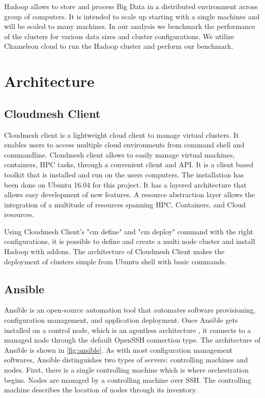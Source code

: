 \documentclass[9pt,twocolumn,twoside]{../../styles/osajnl}
\begin{document}
Hadoop allows to store and process Big Data in a distributed environment across group of computers. It is intended to scale up starting with a single machines and will be scaled to many machines. In our analysis we benchmark the performance of the clusters for various data sizes and cluster configurations. We utilize Chameleon cloud to run the Hadoop cluster and perform our benchmark.

\section{Architecture}
\subsection{Cloudmesh Client}
Cloudmesh client is a lightweight cloud client to manage virtual clusters. It enables users to access multiple cloud environments from command shell and commandline. Cloudmesh client allows to easily manage virtual machines, containers, HPC tasks, through a convenient client and API. It is a client based toolkit that is installed and run on the users computers. The installation has been done on Ubuntu 16.04 for this project. It has a layered architecture that allows easy development of new features. A resource abstraction layer allows the integration of a multitude of resources spanning HPC, Containers, and Cloud resources. 


Using Cloudmesh Client's "cm define" and "cm deploy" command with the right configurations, it is possible to define and create a multi node cluster and install Hadoop with addons. The architecture of Cloudmesh Client makes the deployment of clusters simple from Ubuntu shell with basic commands. 

\subsection{Ansible}
Ansible is an open-source automation tool that automates software provisioning, configuration management, and application deployment. Once Ansible gets installed on a control node, which is an agentless architecture \cite{wiki-ansible}, it connects to a managed node through the default OpenSSH connection type. The architecture of Ansible is shown in \ref{fig:ansible}. As with most configuration management softwares, Ansible distinguishes two types of servers: controlling machines and nodes. First, there is a single controlling machine which is where orchestration begins. Nodes are managed by a controlling machine over SSH. The controlling machine describes the location of nodes through its inventory.
\end{document}
